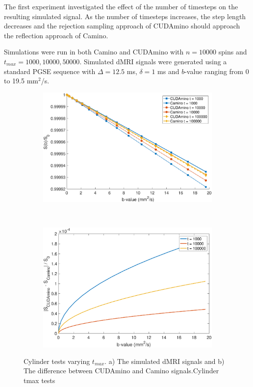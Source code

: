 The first experiment investigated the effect of the number of timesteps on the resulting simulated signal.
As the number of timesteps increases, the step length decreases and the rejection sampling approach of CUDAmino should approach the reflection approach of Camino.

Simulations were run in both Camino and CUDAmino with $n = 10000$ spins and $t_{max} = 1000, 10000, 50000$.
Simulated \ac{dMRI} signals were generated using a standard \ac{PGSE} sequence with $\Delta = 12.5$ ms, $\delta = 1$ ms and $b$-value ranging from 0 to 19.5 mm$^2$/s.


\begin{figure}
  \centering
  \begin{subfigure}{0.49\textwidth}
    \centering
    \includegraphics[width=\textwidth]{figures/cudamino/cyl_tmax.eps}
    \caption{}
    \label{fig:cyl_tmax_sig}
  \end{subfigure}
  ~
  \begin{subfigure}{0.49\textwidth}
    \includegraphics[width=\textwidth]{figures/cudamino/cyl_tmax_diff.eps}
    \caption{}
    \label{fig:cyl_tmax_diff}
  \end{subfigure}
  \caption{Cylinder tests varying $t_{max}$. a) The simulated \ac{dMRI} signals and b) The difference between CUDAmino and Camino signals.Cylinder tmax tests}
  \label{fig:cyl_tmax}
\end{figure}

